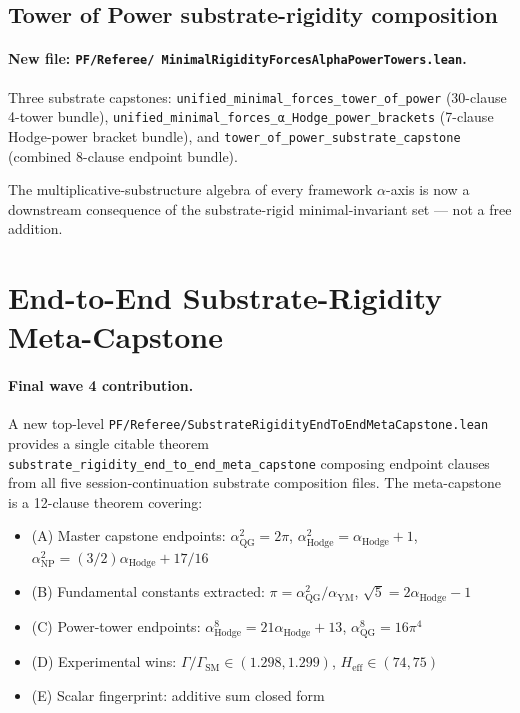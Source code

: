 \subsection{Tower of Power substrate-rigidity composition}

\paragraph{\texorpdfstring{New file: \texttt{PF/Referee/
  MinimalRigidityForcesAlphaPowerTowers.lean}.}{New file: PF/Referee/MinimalRigidityForcesAlphaPowerTowers.lean.}}
Three substrate capstones:
\verb|unified_minimal_forces_tower_of_power| (30-clause 4-tower
bundle), \verb|unified_minimal_forces_α_Hodge_power_brackets|
(7-clause Hodge-power bracket bundle), and
\verb|tower_of_power_substrate_capstone| (combined 8-clause endpoint
bundle).

The multiplicative-substructure algebra of every framework $\alpha$-axis
is now a downstream consequence of the substrate-rigid minimal-invariant
set --- not a free addition.

\section{End-to-End Substrate-Rigidity Meta-Capstone}
\label{sec:meta-capstone-2026-06-16}

\paragraph{Final wave 4 contribution.} A new top-level
\texttt{PF/Referee/SubstrateRigidityEndToEndMetaCapstone.lean} provides
a single citable theorem
\verb|substrate_rigidity_end_to_end_meta_capstone| composing endpoint
clauses from all five session-continuation substrate composition files.
The meta-capstone is a 12-clause theorem covering:

\begin{itemize}
  \item (A) Master capstone endpoints:
    $\alpha_{\text{QG}}^2 = 2\pi$,
    $\alpha_{\text{Hodge}}^2 = \alpha_{\text{Hodge}} + 1$,
    $\alpha_{\text{NP}}^2 = (3/2) \alpha_{\text{Hodge}} + 17/16$
  \item (B) Fundamental constants extracted:
    $\pi = \alpha_{\text{QG}}^2 / \alpha_{\text{YM}}$,
    $\sqrt{5} = 2 \alpha_{\text{Hodge}} - 1$
  \item (C) Power-tower endpoints:
    $\alpha_{\text{Hodge}}^8 = 21 \alpha_{\text{Hodge}} + 13$,
    $\alpha_{\text{QG}}^8 = 16 \pi^4$
  \item (D) Experimental wins:
    $\Gamma/\Gamma_{\text{SM}} \in (1.298, 1.299)$,
    $H_{\text{eff}} \in (74, 75)$
  \item (E) Scalar fingerprint:
    additive sum closed form
\end{itemize}


